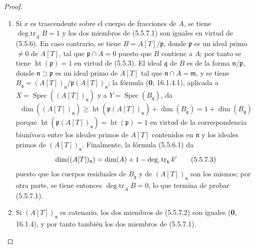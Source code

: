 \begin{proof}
\begin{enumerate}
\item[(i)] Si $x$ es trascendente sobre el cuerpo de fracciones de $A$, se
tiene $\operatorname{deg.tr}_A B=1$ y los dos miembros de (5.5.7.1) son iguales
en virtud de (5.5.6). En caso contrario, se tiene $B=A[T]/\mathfrak p$, donde
$\mathfrak p$ es un ideal primo $\ne0$ de $A[T]$, tal que
$\mathfrak p\cap A=0$ puesto que $B$ contiene a $A$; por tanto se tiene
$\operatorname{ht}(\mathfrak p)=1$ en virtud de (5.5.3). El ideal
$\mathfrak q$ de $B$ es de la forma $\mathfrak n/\mathfrak p$, donde
$\mathfrak n\supset\mathfrak p$ es un ideal primo de $A[T]$ tal que
$\mathfrak n\cap A=\mathfrak m$, y se tiene
$B_{\mathfrak q}=(A[T])_{\mathfrak n}/\mathfrak p(A[T])_{\mathfrak n}$;
la fórmula (\textbf 0, 16.1.4.1), aplicada a
$X=\operatorname{Spec}((A[T])_{\mathfrak n})$ y a
$Y=\operatorname{Spec}(B_{\mathfrak q})$, da
\begin{equation}
\dim((A[T])_{\mathfrak n})
\geq\operatorname{ht}(\mathfrak p(A[T])_{\mathfrak n})
+\dim(B_{\mathfrak q})=1+\dim(B_{\mathfrak q})
\tag{5.5.7.2}\label{IV.2.s5.5.7.2-fr}
\end{equation}
porque $\operatorname{ht}(\mathfrak p(A[T])_{\mathfrak n})
=\operatorname{ht}(\mathfrak p)=1$ en virtud de la correspondencia biunívoca
entre los ideales primos de $A[T]$ contenidos en $\mathfrak n$ y los ideales
primos de $(A[T])_{\mathfrak n}$. Finalmente, la fórmula (5.5.6.1) da
\begin{equation}
\dim((A[T])_{\mathfrak n})
=\dim(A)+1-\operatorname{deg.tr}_k k'
\tag{5.5.7.3}\label{IV.2.s5.5.7.3-fr}
\end{equation}
puesto que los cuerpos residuales de $B_{\mathfrak q}$ y de
$(A[T])_{\mathfrak n}$ son los mismos; por otra parte, se tiene entonces
$\operatorname{deg.tr}_A B=0$, lo que termina de probar (5.5.7.1).
\item[(ii)] Si $(A[T])_{\mathfrak n}$ es catenario, los dos miembros de
(5.5.7.2) son iguales (\textbf 0, 16.1.4), y por tanto también los dos miembros de
(5.5.7.1).
\end{enumerate}
\end{proof}

